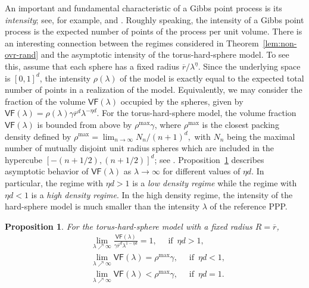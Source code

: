\documentclass[11pt]{article}
\newcommand{\rbdd}{\overline{r}}
\newtheorem{proposition}{Proposition}
\begin{document}
An important and fundamental characteristic of a Gibbs point process is its {\em intensity}; see, for example, \cite[and references therein]{MMSWD01} and \cite{BN12}. Roughly speaking, the intensity of a Gibbs point process is the expected number of points of the process per unit volume. There is an interesting connection between the regimes considered in Theorem~\ref{lem:non-ovr-rand} and the asymptotic intensity of the torus-hard-sphere model. To see this, assume that each sphere has a fixed radius $\rbdd/\lambda^\eta$. Since the underlying space is $[0,1]^d$, the intensity $\rho(\lambda)$ of the model is exactly equal to the expected total number of points in a realization of the model. Equivalently, we may consider the fraction of the volume $\mathsf{VF}(\lambda)$ occupied by the spheres, given by 
$\mathsf{VF}(\lambda) = \rho(\lambda) \gamma \rbdd^d \lambda^{- \eta d}$.
For the torus-hard-sphere model, the volume fraction $\mathsf{VF}(\lambda)$ is bounded from above by $\rho^{\max} \gamma$, where $\rho^{\max}$ is the closest packing density defined by 
$\rho^{\max} = \lim_{n \rightarrow \infty} N_n/(n+1)^d,$
with $N_n$ being the maximal number of mutually disjoint unit radius spheres which are included in the hypercube $[-(n+1/2), (n+1/2)]^d$; see \cite{MMSWD01}. Proposition~\ref{prop:Pack_int} describes asymptotic behavior of $\mathsf{VF}(\lambda)$ as $\lambda \to \infty$ for different values of $\eta d$. In particular, the regime with $\eta d > 1$ is a {\em low density regime} while the regime with $\eta d < 1$ is a {\em high density regime}. In the high density regime, the intensity of the hard-sphere model is much smaller than the intensity $\lambda$ of the reference PPP.
\begin{proposition}
\label{prop:Pack_int}
For the torus-hard-sphere model with a fixed radius $R = \rbdd$,
\begin{align*}
&\lim_{\lambda \nearrow \infty} \frac{\mathsf{VF}(\lambda)}{\gamma \rbdd^d \lambda^{1 - \eta d}} = 1, \quad \text{ if }\, \eta d > 1, \\
&\lim_{\lambda \nearrow \infty} \mathsf{VF}(\lambda) = \rho^{\max} \gamma,   \quad \text{ if }\, \eta d < 1,\\
&\lim_{\lambda \nearrow \infty} \mathsf{VF}(\lambda) <\rho^{\max} \gamma,   \quad \text{ if }\, \eta d = 1.
\end{align*}
\end{proposition}



\end{document}

